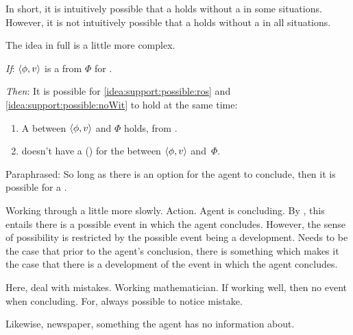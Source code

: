 \begin{note}
  In short, it is intuitively possible that a \ros{} holds without a \wit{} in some situations.
  However, it is not intuitively possible that a \ros{} holds without a \wit{} in all situations.
\end{note}

\begin{note}
  The idea in full is a little more complex.

  \begin{idea}[\supportII{}]%
    \label{idea:support:possible}%
    \vspace{-\baselineskip}
    \begin{itenum}
    \item[\emph{If}:]
      \(\langle \phi, v \rangle\) is a  from \(\Phi\) for \vAgent{}.
    \item[\emph{Then}:]
      It is possible for \ref{idea:support:possible:ros} and \ref{idea:support:possible:noWit} to hold at the same time:
      \begin{enumerate}[label=\alph*., ref=(\alph*)]
      \item
        \label{idea:support:possible:ros}
        A \ros{} between \(\langle \phi, v \rangle\) and \(\Phi\) holds, from .
      \item
        \label{idea:support:possible:noWit}
        \vAgent{} doesn't have a (\pwP{}) \wit{} for the \ros{} between \(\langle \phi, v \rangle\) and~\(\Phi\).
      \end{enumerate}
    \end{itenum}
    \vspace{-\baselineskip}
  \end{idea}

  \noindent%
  Paraphrased:
  So long as there is an option for the agent to conclude, then it is possible for a \ros{}.

  Working through a little more slowly.
  Action.
  Agent is concluding.
  By \assuPP{}, this entails there is a possible event in which the agent concludes.
  However, the sense of possibility is restricted by the possible event being a development.
  Needs to be the case that prior to the agent's conclusion, there is something which makes it the case that there is a development of the event in which the agent concludes.

  Here, deal with mistakes.
  Working mathematician.
  If working well, then no event when concluding.
  For, always possible to notice mistake.

  Likewise, newspaper, something the agent has no information about.


\end{note}
